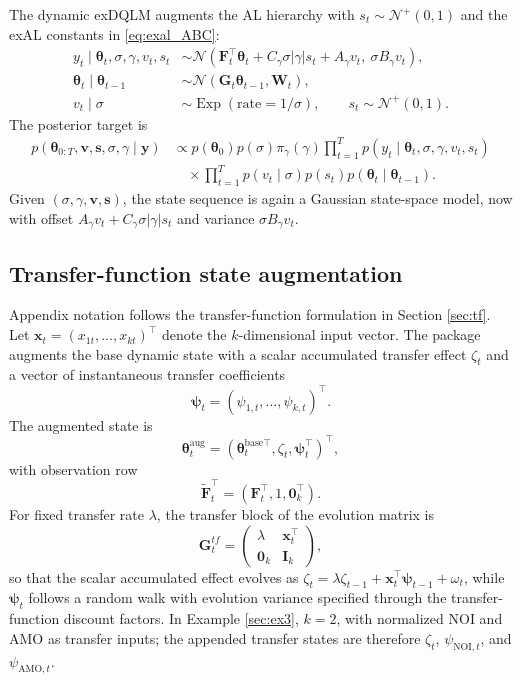 \documentclass{jss}
\newcommand{\vect}[1]{\boldsymbol{#1}}
\newcommand{\mat}[1]{\mathbf{#1}}
\newcommand{\N}{\mathcal{N}}
\newcommand{\Exp}{\operatorname{Exp}}
\newcommand{\TNp}{\mathcal{N}^{+}}
\newcommand{\pigamma}{\pi_\gamma}
\begin{document}
The dynamic exDQLM augments the AL hierarchy with $s_t\sim\TNp(0,1)$ and
the exAL constants in \eqref{eq:exal_ABC}:
\begin{align}
y_t\mid\vect{\theta}_t,\sigma,\gamma,v_t,s_t
&\sim
\N\left(
\mat{F}_t^\top\vect{\theta}_t
+C_\gamma\sigma|\gamma|s_t+A_\gamma v_t,\
\sigma B_\gamma v_t
\right),\\
\vect{\theta}_t\mid\vect{\theta}_{t-1}
&\sim \N(\mat{G}_t\vect{\theta}_{t-1},\mat{W}_t),\\
v_t\mid\sigma&\sim\Exp(\text{rate}=1/\sigma),\qquad
s_t\sim\TNp(0,1).
\label{eq:dyn_exdqlm_obs}
\end{align}
The posterior target is
\begin{align}
p(\vect{\theta}_{0:T},\vect{v},\vect{s},\sigma,\gamma\mid\vect{y})
&\propto
p(\vect{\theta}_0)p(\sigma)\pigamma(\gamma)
\prod_{t=1}^T p(y_t\mid\vect{\theta}_t,\sigma,\gamma,v_t,s_t)
\nonumber\\
&\quad{}\times
\prod_{t=1}^T
p(v_t\mid\sigma)p(s_t)
p(\vect{\theta}_t\mid\vect{\theta}_{t-1}).
\label{eq:dyn_exdqlm_joint}
\end{align}
Given $(\sigma,\gamma,\vect{v},\vect{s})$, the state sequence is again a
Gaussian state-space model, now with offset
$A_\gamma v_t+C_\gamma\sigma|\gamma|s_t$ and variance
$\sigma B_\gamma v_t$.

\subsection{Transfer-function state augmentation}
\label{sec:appendix_transfer_function}

Appendix notation follows the transfer-function formulation in Section
\ref{sec:tf}. Let \(\mat{x}_t=(x_{1t},\ldots,x_{kt})^\top\) denote the
\(k\)-dimensional input vector. The package augments the base dynamic state with
a scalar accumulated transfer effect \(\zeta_t\) and a vector of instantaneous
transfer coefficients
\[
\vect{\psi}_t=(\psi_{1,t},\ldots,\psi_{k,t})^\top.
\]
The augmented state is
\begin{equation}
\vect{\theta}^{\mathrm{aug}}_t
=
(\vect{\theta}^{\mathrm{base}\top}_t,\zeta_t,\vect{\psi}_t^\top)^\top,
\label{eq:tf_aug_state}
\end{equation}
with observation row
\[
\tilde{\mat{F}}_t^\top=(\mat{F}_t^\top,1,\mat{0}_k^\top).
\]
For fixed transfer rate \(\lambda\), the transfer block of the evolution matrix is
\[
\mat{G}^{tf}_t =
\begin{pmatrix}
\lambda & \mat{x}_t^\top \\
\mat{0}_k & \mat{I}_k
\end{pmatrix},
\]
so that the scalar accumulated effect evolves as
\(\zeta_t=\lambda\zeta_{t-1}+\mat{x}_t^\top\vect{\psi}_{t-1}+\omega_t\),
while \(\vect{\psi}_t\) follows a random walk with evolution variance specified
through the transfer-function discount factors. In Example \ref{sec:ex3},
\(k=2\), with normalized NOI and AMO as transfer inputs; the appended transfer
states are therefore \(\zeta_t\), \(\psi_{\mathrm{NOI},t}\), and
\(\psi_{\mathrm{AMO},t}\).
\end{document}
